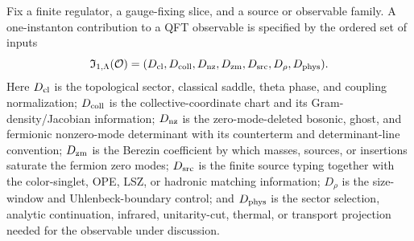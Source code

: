 \begin{definition}
\label{def:one-instanton-amplitude-datum}
Fix a finite regulator, a gauge-fixing slice, and a source or observable
family.  A one-instanton contribution to a QFT observable is specified by the
ordered set of inputs
\begin{equation}
  \mathfrak I_{1,\Lambda}(\mathcal O)
  =
  (D_{\rm cl},D_{\rm coll},D_{\rm nz},D_{\rm zm},
   D_{\rm src},D_\rho,D_{\rm phys}) .
  \label{eq:one-instanton-amplitude-datum}
\end{equation}
Here \(D_{\rm cl}\) is the topological sector, classical saddle, theta phase,
and coupling normalization; \(D_{\rm coll}\) is the collective-coordinate chart
and its Gram-density/Jacobian information; \(D_{\rm nz}\) is the zero-mode-deleted
bosonic, ghost, and fermionic nonzero-mode determinant with its counterterm and
determinant-line convention; \(D_{\rm zm}\) is the Berezin coefficient by which
masses, sources, or insertions saturate the fermion zero modes;
\(D_{\rm src}\) is the finite source typing together with the color-singlet,
OPE, LSZ, or hadronic matching information; \(D_\rho\) is the size-window and
Uhlenbeck-boundary control; and \(D_{\rm phys}\) is the sector selection,
analytic continuation,
infrared, unitarity-cut, thermal, or transport projection needed for the
observable under discussion.
\end{definition}

